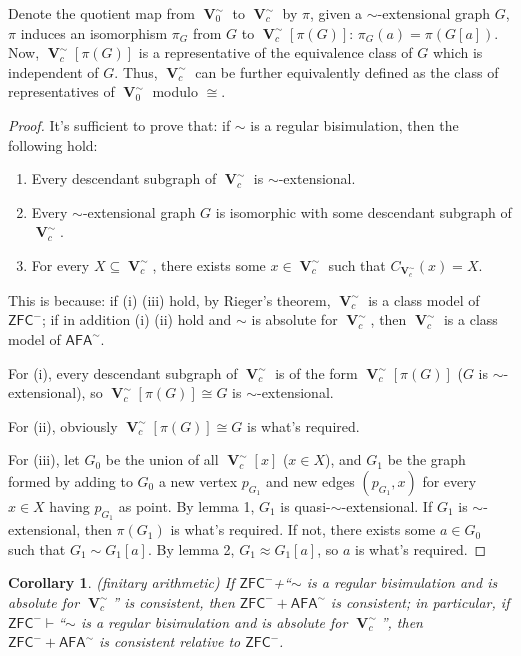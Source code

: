 \documentclass{amsart}
\newcommand{\zfc}{\mathsf{ZFC}}
\newcommand{\afa}{\mathsf{AFA}}
\DeclareMathOperator{\uni}{\mathbf{V}}
\newtheorem{corollary}{Corollary}
\begin{document}
Denote the quotient map from $\uni_0^\sim$ to $\uni_c^\sim$ by $\pi$, given a $\sim$-extensional graph $G$, $\pi$ induces an isomorphism $\pi_G$ from $G$ to $\uni_c^\sim[\pi(G)]$: $\pi_G(a)=\pi(G[a])$.
Now, $\uni_c^\sim[\pi(G)]$ is a representative of the equivalence class of $G$ which is independent of $G$. Thus, $\uni_c^\sim$ can be further equivalently defined as the class of representatives of $\uni_0^\sim$ modulo $\cong$.
\begin{proof}
    It's sufficient to prove that: if $\sim$ is a regular bisimulation, then the following hold:
    \begin{enumerate}[label=(\roman*)]
        \item Every descendant subgraph of $\uni_c^\sim$ is $\sim$-extensional.
        \item Every $\sim$-extensional graph $G$ is isomorphic with some descendant subgraph of $\uni_c^\sim$.
        \item For every $X\subseteq \uni_c^\sim$, there exists some $x\in \uni_c^\sim$ such that $C_{\uni_c^\sim}(x)=X$.
    \end{enumerate}
    
    This is because: if (i) (iii) hold, by Rieger's theorem\cite{Rieger}, $\uni_c^\sim$ is a class model of $\zfc^-$; if in addition (i) (ii) hold and $\sim$ is absolute for $\uni_c^\sim$, then $\uni_c^\sim$ is a class model of $\afa^\sim$.
    
    For (i), every descendant subgraph of $\uni_c^\sim$ is of the form $\uni_c^\sim[\pi(G)]$ ($G$ is $\sim$-extensional), so $\uni_c^\sim[\pi(G)] \cong G$ is $\sim$-extensional.
        
    For (ii), obviously $\uni_c^\sim[\pi(G)] \cong G$ is what's required.
    
    For (iii), let $G_0$ be the union of all $\uni_c^\sim[x]$ ($x \in X$), and $G_1$ be the graph formed by adding to $G_0$ a new vertex $p_{G_1}$ and new edges $(p_{G_1}, x)$ for every $x \in X$ having $p_{G_1}$ as point. By lemma 1, $G_1$ is quasi-$\sim$-extensional. If $G_1$ is $\sim$-extensional, then $\pi(G_1)$ is what's required. If not, there exists some $a\in G_0$ such that $G_1\sim G_1[a]$. By lemma 2, $G_1\approx G_1[a]$, so $a$ is what's required.
\end{proof}

\begin{corollary}
    (finitary arithmetic) If $\zfc^-$+``$\sim$ is a regular bisimulation and is absolute for $\uni_c^\sim$'' is consistent, then $\zfc^-+\afa^\sim$ is consistent; in particular, if $\zfc^-\vdash$``$\sim$ is a regular bisimulation and is absolute for $\uni_c^\sim$'', then $\zfc^-+\afa^\sim$ is consistent relative to $\zfc^-$.
\end{corollary}
\end{document}
